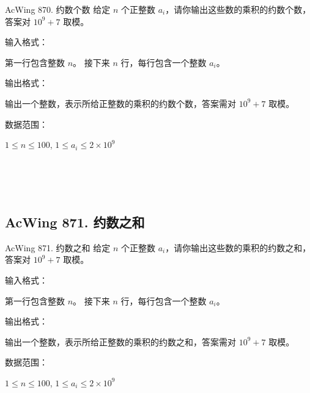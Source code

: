 \begin{titledbox}{AcWing 870. 约数个数}
    给定 $n$ 个正整数 $a_i$，请你输出这些数的乘积的约数个数，答案对 $10^9+7$ 取模。

    输入格式：

    第一行包含整数 $n$。 接下来 $n$ 行，每行包含一个整数 $a_i$。

    输出格式：

    输出一个整数，表示所给正整数的乘积的约数个数，答案需对 $10^9+7$ 取模。

    数据范围：

    $1 \le n \le 100$, $1 \le a_i \le 2 \times 10^9$

    \begin{inputblock}
         \\
         \\
         \\
    \end{inputblock}
    \begin{outputblock}
    \end{outputblock}
\end{titledbox}

\subsection{AcWing 871. 约数之和}
\begin{titledbox}{AcWing 871. 约数之和}
    给定 $n$ 个正整数 $a_i$，请你输出这些数的乘积的约数之和，答案对 $10^9+7$ 取模。

    输入格式：

    第一行包含整数 $n$。 接下来 $n$ 行，每行包含一个整数 $a_i$。

    输出格式：

    输出一个整数，表示所给正整数的乘积的约数之和，答案需对 $10^9+7$ 取模。

    数据范围：

    $1 \le n \le 100$, $1 \le a_i \le 2 \times 10^9$

    \begin{inputblock}
         \\
         \\
         \\
    \end{inputblock}
    \begin{outputblock}
    \end{outputblock}
\end{titledbox}

